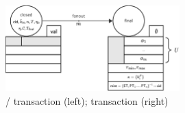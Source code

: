 \begin{figure}[h]
	\centering
	\includegraphics[width=0.6\textwidth]{figures/SM-fanout.pdf}
	\caption{\mtxClose{}/\mtxContest{} transaction (left);
		\mtxFanout{} transaction (right)}\label{fig:SM-fanout}
\end{figure}

\FloatBarrier{}

